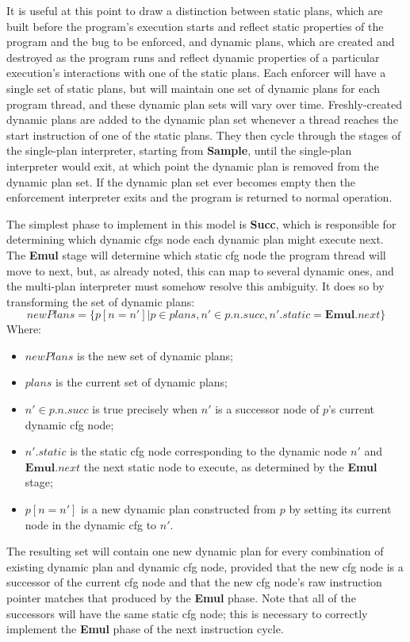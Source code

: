 It is useful at this point to draw a distinction between static plans,
which are built before the program's execution starts and reflect
static properties of the program and the bug to be enforced, and
dynamic plans, which are created and destroyed as the program runs and
reflect dynamic properties of a particular execution's interactions
with one of the static plans.  Each enforcer will have a single set of
static plans, but will maintain one set of dynamic plans for each
program thread, and these dynamic plan sets will vary over time.
Freshly-created dynamic plans are added to the dynamic plan set
whenever a thread reaches the start instruction of one of the static
plans.  They then cycle through the stages of the single-plan
interpreter, starting from \textbf{Sample}, until the single-plan
interpreter would exit, at which point the dynamic plan is removed
from the dynamic plan set.  If the dynamic plan set ever becomes empty
then the enforcement interpreter exits and the program is returned to
normal operation.

The simplest phase to implement in this model is \textbf{Succ}, which
is responsible for determining which \glspl{dynamic cfg} node each
dynamic plan might execute next.  The \textbf{Emul} stage will
determine which \gls{static cfg} node the program thread will move to
next, but, as already noted, this can map to several dynamic ones, and
the multi-plan interpreter must somehow resolve this ambiguity.  It
does so by transforming the set of dynamic plans:
\begin{displaymath}
\mathit{newPlans} = \{p[n = n'] | p \in \mathit{plans}, n' \in p.n.\mathit{succ}, n'\!.\mathit{static} = \mathbf{Emul}.\mathit{next} \}
\end{displaymath}
Where:
\begin{itemize}
\item $\mathit{newPlans}$ is the new set of dynamic plans;
\item $\mathit{plans}$ is the current set of dynamic plans;
\item $n' \in p.n.\mathit{succ}$ is true precisely when $n'$ is a
  successor node of $p$'s current \gls{dynamic cfg} node;
\item $n'.\mathit{static}$ is the \gls{static cfg} node corresponding
  to the dynamic node $n'$ and $\mathbf{Emul}.\mathit{next}$ the next
  static node to execute, as determined by the \textbf{Emul} stage;
\item $p[n = n']$ is a new dynamic plan constructed from $p$ by
  setting its current node in the \gls{dynamic cfg} to $n'$.
\end{itemize}
The resulting set will contain one new dynamic plan for every
combination of existing dynamic plan and \gls{dynamic cfg} node,
provided that the new \gls{cfg} node is a successor of the current
\gls{cfg} node and that the new \gls{cfg} node's raw instruction
pointer matches that produced by the \textbf{Emul} phase.  Note that
all of the successors will have the same \gls{static cfg} node; this
is necessary to correctly implement the \textbf{Emul} phase of the
next instruction cycle.

